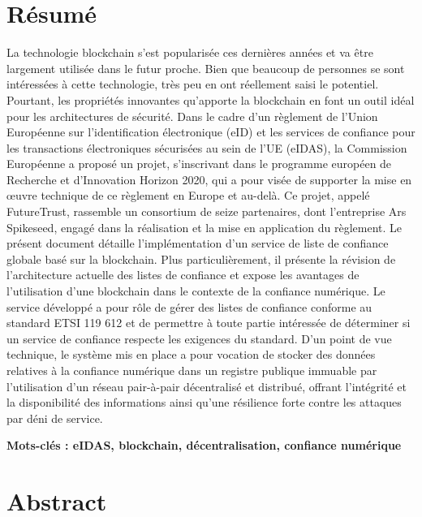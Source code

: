 \documentclass{tnreport}
\begin{document}
\cleardoublepage
\thispagestyle{empty}

\section*{Résumé}

La technologie blockchain s'est popularisée ces dernières années et va être largement utilisée dans le futur proche.
Bien que beaucoup de personnes se sont intéressées à cette technologie, très peu en ont réellement saisi le potentiel.
Pourtant, les propriétés innovantes qu'apporte la blockchain en font un outil idéal pour les architectures de sécurité.
Dans le cadre d'un règlement de l'Union Européenne sur l'identification électronique (eID) et les services de confiance pour les transactions électroniques sécurisées au sein de l'UE (eIDAS), la Commission Européenne a proposé un projet, s'inscrivant dans le programme européen de Recherche et d'Innovation Horizon 2020, qui a pour visée de supporter la mise en œuvre technique de ce règlement en Europe et au-delà.
Ce projet, appelé FutureTrust, rassemble un consortium de seize partenaires, dont l'entreprise Ar{\texteta}s Spikeseed, engagé dans la réalisation et la mise en application du règlement.
Le présent document détaille l'implémentation d'un service de liste de confiance globale basé sur la blockchain.
Plus particulièrement, il présente la révision de l’architecture actuelle des listes de confiance et expose les avantages de l'utilisation d'une blockchain dans le contexte de la confiance numérique.
Le service développé a pour rôle de gérer des listes de confiance conforme au standard ETSI 119 612 et de permettre à toute partie intéressée de déterminer si un service de confiance respecte les exigences du standard.
D'un point de vue technique, le système mis en place a pour vocation de stocker des données relatives à la confiance numérique dans un registre publique immuable par l'utilisation d'un réseau pair-à-pair décentralisé et distribué, offrant l'intégrité et la disponibilité des informations ainsi qu'une résilience forte contre les attaques par déni de service.

{\bf Mots-clés : eIDAS, blockchain, décentralisation, confiance numérique} 


\section*{Abstract}
\end{document}
